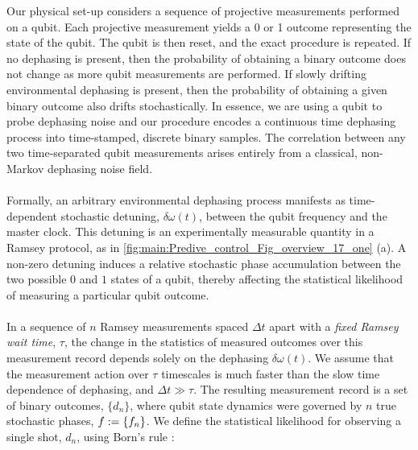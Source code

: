 Our physical set-up considers a sequence of projective measurements performed on a qubit. Each projective measurement yields a 0 or 1 outcome representing the state of the qubit. The qubit is then reset, and the exact procedure is repeated. If no dephasing is present, then the probability of obtaining a binary outcome does not change as more qubit measurements are performed. If slowly drifting environmental dephasing is present, then the probability of obtaining a given binary outcome also drifts stochastically. In essence, we are using a qubit to probe dephasing noise and our procedure encodes a continuous time dephasing process into time-stamped, discrete binary samples.  The correlation between any two time-separated qubit measurements arises entirely from a classical, non-Markov dephasing noise field. 
\\
\\
Formally, an arbitrary environmental dephasing process manifests as time-dependent stochastic detuning, $\delta \omega (t)$, between the qubit frequency and the master clock. This detuning is an experimentally measurable quantity in a Ramsey protocol, as in \cref{fig:main:Predive_control_Fig_overview_17_one} (a). A non-zero detuning induces a relative stochastic phase accumulation between the two possible $0$ and $1$ states of a qubit, thereby affecting the statistical likelihood of measuring a particular qubit outcome. 
\\
\\
In a sequence of $n$ Ramsey measurements spaced $\Delta t$ apart with a \textit{fixed Ramsey wait time}, $\tau$, the change in the statistics of measured outcomes over this measurement record depends solely on the dephasing  $\delta \omega(t)$.   We assume that the measurement action over $\tau$ timescales is much faster than the slow time dependence of dephasing, and $\Delta t \gg \tau$. The resulting measurement record is a set of binary outcomes,  $\{d_n\}$,  where qubit state dynamics were governed by $n$ true stochastic phases, $f := \{f_n\}$. We define the statistical likelihood for observing a single shot, $d_n$, using Born's rule \cite{ferrie2013}:

